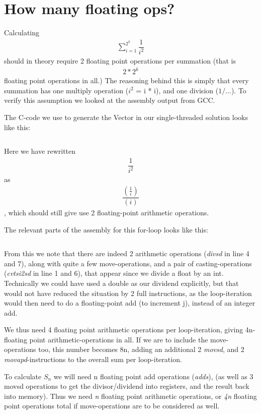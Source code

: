 \section{How many floating ops?}

Calculating \begin{align*}\sum_{i=1}^{2^k}\dfrac{1}{i^2}\end{align*} should in theory require 2 floating
point operations per summation (that is \begin{align*}2*2^k\end{align*} floating point operations in all.)
The reasoning behind this is simply that every summation has one multiply operation ($i^2$ = i * i), and one division
($1/...$). To verify this assumption we looked at the assembly output from GCC.

The C-code we use to generate the Vector in our single-threaded solution
looks like this:
\inputminted[tabsize=4]{c}{CreateVector.c}

Here we have rewritten \begin{align*}\dfrac{1}{i^2}\end{align*} as \begin{align*}\dfrac{\left(\frac{1}{i}\right)}{(i)}\end{align*}, which
should still give use 2 floating-point arithmetic operations.

The relevant parts of the assembly for this for-loop looks like this:

\inputminted[linenos]{gas}{SingleThread.s}

From this we note that there are indeed 2 arithmetic operations (\textit{divsd} in line 4 and 7), along with quite a few move-operations,
and a pair of casting-operations (\textit{cvtsi2sd} in line 1 and 6), that appear since we divide a float by an int. Technically we could
have used a double as our dividend explicitly, but that would not have reduced the situation by 2 full instructions,
as the loop-iteration would then need to do a floating-point add (to increment j), instead of an integer add.

We thus need 4 floating point arithmetic operations per loop-iteration, giving 4n-floating point arithmetic-operations in all. If we are to include the move-operations too, this number becomes 8n, adding an additional 2 \textit{movsd},
and 2 \textit{movapd}-instructions to the overall sum per loop-iteration.

To calculate $S_n$ we will need n floating point add operations (\textit{adds}), (as well as 3 movsd operations to get the divisor/dividend
into registers, and the result back into memory). Thus we need \textit{n} floating point arithmetic operations, or \textit{4n} floating point
operations total if move-operations are to be considered as well.

